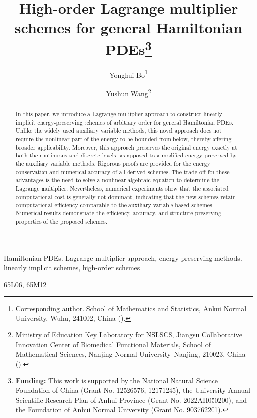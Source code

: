 \documentclass[onefignum,onetabnum]{siamart}
\title{High-order Lagrange multiplier schemes for general Hamiltonian PDEs\thanks{\textbf{Funding:} This work is supported by the National Natural Science Foundation of China (Grant No. 12526576, 12171245), the University Annual Scientific Research Plan of Anhui Province (Grant No. 2022AH050200), and the Foundation of Anhui Normal University (Grant No. 903762201).}}
\author{
Yonghui Bo\thanks{Corresponding author. School of Mathematics and Statistics, Anhui Normal University, Wuhu, 241002, China (\email{boyonghui@ahnu.edu.cn}).}
\and Yushun Wang\thanks{Ministry of Education Key Laboratory for NSLSCS, Jiangsu Collaborative Innovation Center of Biomedical Functional Materials, School of Mathematical Sciences, Nanjing Normal University, Nanjing, 210023, China (\email{wangyushun@njnu.edu.cn}).}
}
\begin{document}
\maketitle
\begin{abstract}
In this paper, we introduce a Lagrange multiplier approach to construct linearly implicit energy-preserving schemes of arbitrary order for general Hamiltonian PDEs. Unlike the widely used auxiliary variable methods, this novel approach does not require the nonlinear part of the energy to be bounded from below, thereby offering broader applicability. Moreover, this approach preserves the original energy exactly at both the continuous and discrete levels, as opposed to a modified energy preserved by the auxiliary variable methods. Rigorous proofs are provided for the energy conservation and numerical accuracy of all derived schemes. The trade-off for these advantages is the need to solve a nonlinear algebraic equation to determine the Lagrange multiplier. Nevertheless, numerical experiments show that the associated computational cost is generally not dominant, indicating that the new schemes retain computational efficiency comparable to the auxiliary variable-based schemes. Numerical results demonstrate the efficiency, accuracy, and structure-preserving properties of the proposed schemes.
\end{abstract}

\begin{keywords}
Hamiltonian PDEs, 
Lagrange multiplier approach, 
energy-preserving methods, 
linearly implicit schemes, 
high-order schemes
\end{keywords}

\begin{MSCcodes}
65L06, 65M12
\end{MSCcodes}
\end{document}
